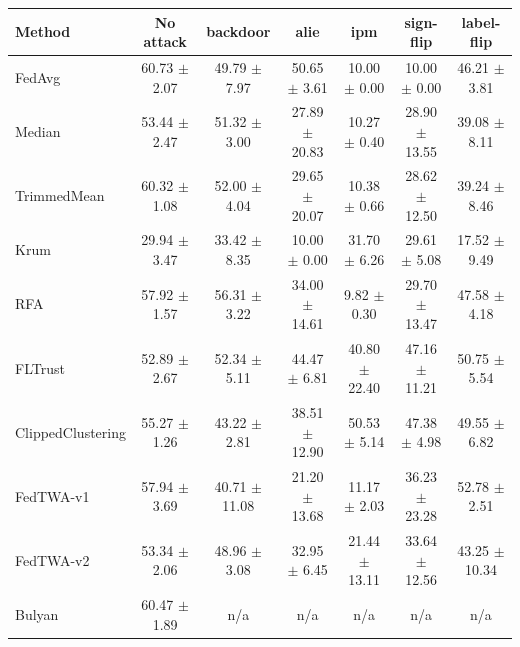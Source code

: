 \begin{tabular}{lcccccc}
\toprule
Method & No attack & backdoor & alie & ipm & sign-flip & label-flip \\
\midrule
FedAvg & 60.73 $\pm$ 2.07 & 49.79 $\pm$ 7.97 & 50.65 $\pm$ 3.61 & 10.00 $\pm$ 0.00 & 10.00 $\pm$ 0.00 & 46.21 $\pm$ 3.81 \\
Median & 53.44 $\pm$ 2.47 & 51.32 $\pm$ 3.00 & 27.89 $\pm$ 20.83 & 10.27 $\pm$ 0.40 & 28.90 $\pm$ 13.55 & 39.08 $\pm$ 8.11 \\
TrimmedMean & 60.32 $\pm$ 1.08 & 52.00 $\pm$ 4.04 & 29.65 $\pm$ 20.07 & 10.38 $\pm$ 0.66 & 28.62 $\pm$ 12.50 & 39.24 $\pm$ 8.46 \\
Krum & 29.94 $\pm$ 3.47 & 33.42 $\pm$ 8.35 & 10.00 $\pm$ 0.00 & 31.70 $\pm$ 6.26 & 29.61 $\pm$ 5.08 & 17.52 $\pm$ 9.49 \\
RFA & 57.92 $\pm$ 1.57 & 56.31 $\pm$ 3.22 & 34.00 $\pm$ 14.61 & 9.82 $\pm$ 0.30 & 29.70 $\pm$ 13.47 & 47.58 $\pm$ 4.18 \\
FLTrust & 52.89 $\pm$ 2.67 & 52.34 $\pm$ 5.11 & 44.47 $\pm$ 6.81 & 40.80 $\pm$ 22.40 & 47.16 $\pm$ 11.21 & 50.75 $\pm$ 5.54 \\
ClippedClustering & 55.27 $\pm$ 1.26 & 43.22 $\pm$ 2.81 & 38.51 $\pm$ 12.90 & 50.53 $\pm$ 5.14 & 47.38 $\pm$ 4.98 & 49.55 $\pm$ 6.82 \\
FedTWA-v1 & 57.94 $\pm$ 3.69 & 40.71 $\pm$ 11.08 & 21.20 $\pm$ 13.68 & 11.17 $\pm$ 2.03 & 36.23 $\pm$ 23.28 & 52.78 $\pm$ 2.51 \\
FedTWA-v2 & 53.34 $\pm$ 2.06 & 48.96 $\pm$ 3.08 & 32.95 $\pm$ 6.45 & 21.44 $\pm$ 13.11 & 33.64 $\pm$ 12.56 & 43.25 $\pm$ 10.34 \\
Bulyan & 60.47 $\pm$ 1.89 & n/a & n/a & n/a & n/a & n/a \\
\bottomrule
\end{tabular}